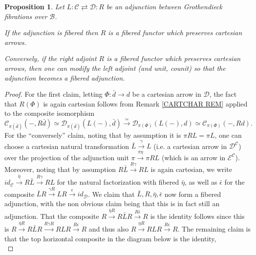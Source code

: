 \documentclass[a4paper,10pt
,draft
]{article}%
\numberwithin{equation}{section}
\numberwithin{figure}{section}
\newtheorem{proposition}[equation]{Proposition}%
\theoremstyle{definition} %
\newcommand{\1}{\ensuremath{\mathbbm 1}}%
\begin{document}
\begin{proposition}\label{FIBADJCAR PROP}
	Let $L \colon \mathcal{C} \rightleftarrows \mathcal{D} \colon R$
	be an adjunction between Grothendieck fibrations
	over $\mathcal{B}$.
	
	If the adjunction is fibered then 
	$R$ is 
	a fibered functor which preserves cartesian arrows.
	
	Conversely, if the right adjoint $R$ is 
	a fibered functor which preserves cartesian arrows, 
	then one can modify the left adjoint (and unit, counit)
	so that the adjunction becomes a fibered adjunction.
\end{proposition}


\begin{proof}
	For the first claim, 
	letting $\Phi \colon \bar{d} \to d$ be a cartesian arrow
	in $\mathcal{D}$, 
	the fact that $R(\Phi)$ is again cartesian follows from
	Remark \ref{CARTCHAR REM} applied to the composite isomorphism
	\[
	\mathcal{C}_{\pi(\bar{d})}
	\left(-,R\bar{d}\right)
	\simeq 
	\mathcal{D}_{\pi(\bar{d})}
	\left(L(-),\bar{d}\right)
	\xrightarrow{\simeq}
	\mathcal{D}_{\pi(\Phi)}\left(L(-),d\right)
	\simeq
	\mathcal{C}_{\pi(\Phi)}\left(-,Rd\right).
	\]
	For the ``conversely'' claim,
	noting that by assumption it is $\pi RL = \pi L$,
	one can choose a cartesian natural transformation 
	$\bar{L} \xrightarrow{\gamma} L$
	(i.e. a cartesian arrow in $\mathcal{D}^{\mathcal{C}}$)
	over the projection of the adjunction unit
	$\pi \xrightarrow{\pi \eta} \pi RL$
	(which is an arrow in $\mathcal{E}^{\mathcal{C}}$).
	Moreover, noting that by assumption
	$R\bar{L} \xrightarrow{R \gamma} RL$ is again cartesian,
	we write
	$id_{\mathcal{C}} \xrightarrow{\bar{\eta}} 
	R \bar{L} \xrightarrow{R \gamma} RL$
	for the natural factorization
	with fibered $\bar{\eta}$,
	as well as $\bar{\epsilon}$ for the composite
	$\bar{L}R \xrightarrow{\gamma R} 
	LR \xrightarrow{\epsilon} id_{\mathcal{D}}$.
	We claim that $\bar{L},R,\bar{\eta},\bar{\epsilon}$
	now form a fibered adjunction, with the non obvious claim being that this is in fact still an adjunction.
	That the composite
	$R\xrightarrow{\bar{\eta}R} R\bar{L}R \xrightarrow{R\bar{\epsilon}} R$
	is the identity follows since this is 
	$R \xrightarrow{\bar{\eta} R} R\bar{L}R 
	\xrightarrow{R \gamma R} RLR \xrightarrow{R \epsilon} R$ 
	and thus also $R \xrightarrow{\eta R} RLR \xrightarrow{R \epsilon} R$.
	The remaining claim is that the top horizontal composite in the diagram below is the identity, 
	\begin{equation}

\end{equation}
\end{proof}
\end{document}
